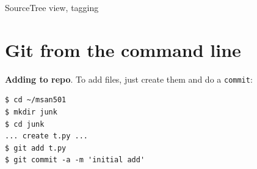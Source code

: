 \begin{marginfigure}
\begin{center}
\end{center}
\caption{SourceTree view, tagging}
\end{marginfigure}

\section{Git from the command line}

{\bf Adding to repo}. To add files, just create them and do a {\tt commit}:

\begin{lstlisting}[style=BashInputStyle]
$ cd ~/msan501
$ mkdir junk
$ cd junk
... create t.py ...
$ git add t.py
$ git commit -a -m 'initial add'
\end{lstlisting}


